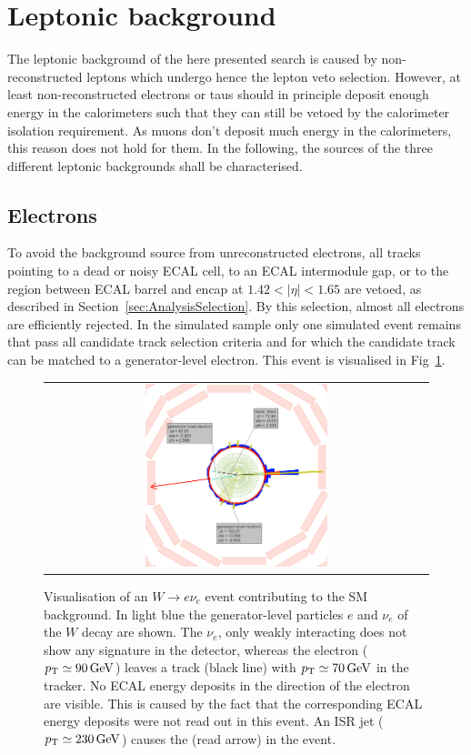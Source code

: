 \section{Leptonic background}
\label{sec:LeptonicBkg}

The leptonic background of the here presented search is caused by non-reconstructed leptons which undergo hence the lepton veto selection.
However, at least non-reconstructed electrons or taus should in principle deposit enough energy in the calorimeters such that they can still be vetoed by the calorimeter isolation requirement.
As muons don't deposit much energy in the calorimeters, this reason does not hold for them.
In the following, the sources of the three different leptonic backgrounds shall be characterised.

\subsection*{Electrons}
To avoid the background source from unreconstructed electrons, all tracks pointing to a dead or noisy ECAL cell, to an ECAL intermodule gap, or to the region between ECAL barrel and encap at $1.42<|\eta|<1.65$ are vetoed, 
as described in Section~\ref{sec:AnalysisSelection}.
By this selection, almost all electrons are efficiently rejected.
In the simulated \WJets sample only one simulated event remains that pass all candidate track selection criteria and for which the candidate track can be matched to a generator-level electron.
This event is visualised in Fig~\ref{fig:LostElectron}. 
\begin{figure}[!tb]
  \centering 
  \begin{tabular}{c}
    \includegraphics[width=0.49\textwidth]{figures/analysis/Electron_lumi_279317_event_111637553.png}
  \end{tabular}
  \caption{Visualisation of an $W\rightarrow e\nu_e$ event contributing to the SM background. 
           In light blue the generator-level particles $e$ and $\nu_e$ of the $W$ decay are shown. 
           The $\nu_e$, only weakly interacting does not show any signature in the detector, whereas the electron ($p_{\text{T}}\simeq 90\,\text{Ge}\kern-0.06667em\text{V}$) leaves a track (black line) with \mbox{$p_{\text{T}}\simeq 70\,\text{Ge}\kern-0.06667em\text{V}$} in the tracker. 
           No ECAL energy deposits in the direction of the electron are visible. 
           This is caused by the fact that the corresponding ECAL energy deposits were not read out in this event.
           An ISR jet ($p_{\text{T}}\simeq 230\,\text{Ge}\kern-0.06667em\text{V}$) causes the \met (read arrow) in the event. }
  \label{fig:LostElectron}
\end{figure}
